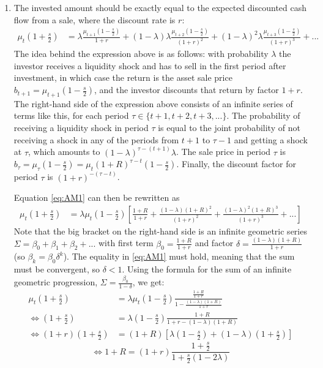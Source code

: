 \documentclass[a4paper]{article}
\begin{document}
\begin{enumerate}
	\item The invested amount should be exactly equal to the expected discounted cash flow from a sale, where the discount rate is $r$:
	\begin{align}
		\mu_t\left( 1+\frac{s}{2} \right) 
		&= \lambda \frac{\mu_{t+1}\left(1-\frac{s}{2}\right)}{1+r} + (1-\lambda) \lambda \frac{\mu_{t+2}\left(1-\frac{s}{2}\right)}{(1+r)^2} + (1-\lambda)^2 \lambda \frac{\mu_{t+3}\left(1-\frac{s}{2}\right)}{(1+r)^3} + ...
		\label{eq:AM1}
	\end{align}
	The idea behind the expression above is as follows: with probability $\lambda$ the investor receives a liquidity shock and has to sell in the first period after investment, in which case the return is the asset sale price $b_{t+1} = \mu_{t+1}\left(1-\frac{s}{2}\right)$, and the investor discounts that return by factor $1+r$. The right-hand side of the expression above consists of an infinite series of terms like this, for each period $\tau \in \{t+1,t+2,t+3,...\}$. The probability of receiving a liquidity shock in period $\tau$ is equal to the joint probability of not receiving a shock in any of the periods from $t+1$ to $\tau-1$ and getting a shock at $\tau$, which amounts to $(1-\lambda)^{\tau-(t+1)} \lambda$. The sale price in period $\tau$ is $b_\tau = \mu_{\tau} \left(1-\frac{s}{2}\right) = \mu_t (1+R)^{\tau-t} \left(1-\frac{s}{2}\right)$. Finally, the discount factor for period $\tau$ is $(1+r)^{-(\tau-t)}$.
	
	Equation \eqref{eq:AM1} can then be rewritten as
	\begin{align*}
		\mu_t\left( 1+\frac{s}{2} \right) 
		&= \lambda \mu_t \left( 1 - \frac{s}{2} \right) \left[ \frac{1+R}{1+r} + \frac{(1-\lambda)(1+R)^2}{(1+r)^2} + \frac{(1-\lambda)^2(1+R)^3}{(1+r)^3} + ... \right]
	\end{align*}
	Note that the big bracket on the right-hand side is an infinite geometric series $\Sigma = \beta_0 + \beta_1 + \beta_2 + ...$ with first term $\beta_0 = \frac{1+R}{1+r}$ and factor $\delta = \frac{(1-\lambda)(1+R)}{1+r}$ (so $\beta_k = \beta_0 \delta^k$). The equality in \eqref{eq:AM1} must hold, meaning that the sum must be convergent, so $\delta < 1$. Using the formula for the sum of an infinite geometric progression, $\Sigma = \frac{\beta_0}{1-\delta}$, we get:
	\begin{align*}
		\mu_t\left( 1+\frac{s}{2} \right) 
		&= \lambda \mu_t \left( 1 - \frac{s}{2} \right) \frac{\frac{1+R}{1+r}}{1-\frac{(1-\lambda)(1+R)}{1+r}}
		\\
		\iff
		\left( 1+\frac{s}{2} \right) &= \lambda \left( 1 - \frac{s}{2} \right) \frac{1+R}{1+r - (1-\lambda)(1+R)}
		\\
		\iff
		(1+r) \left( 1 + \frac{s}{2} \right) &= (1+R) \left[ \lambda \left( 1 - \frac{s}{2} \right) + (1-\lambda) \left( 1 + \frac{s}{2} \right) \right]
	\end{align*}
	\begin{equation}
		\iff
		1+R = (1+r) \frac{1 + \frac{s}{2}}{1 + \frac{s}{2} (1-2\lambda)}
		\label{eq:AM2}
	\end{equation}


\end{enumerate}
\end{document}
